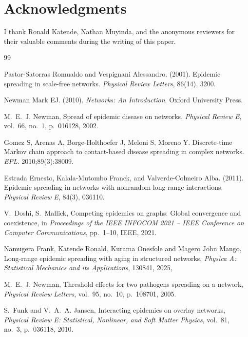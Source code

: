 \documentclass[a4paper,12pt]{scrartcl}
\theoremstyle{plain}%
\theoremstyle{definition}
\theoremstyle{remark}
\numberwithin{equation}{section}
\begin{document}
\section*{Acknowledgments}
I thank Ronald Katende, Nathan Muyinda, and the anonymous reviewers for their valuable comments during the writing of this paper.

{
\begin{thebibliography}{99}

Pastor-Satorras Romualdo and Vespignani Alessandro. (2001).
\newblock Epidemic spreading in scale-free networks.
\newblock \emph{Physical Review Letters}, 86(14), 3200.

Newman Mark EJ. (2010).
\newblock \emph{Networks: An Introduction}.
\newblock Oxford University Press.

M.~E.~J. Newman, Spread of epidemic disease on networks, \textit{Physical Review E}, vol.~66, no.~1, p.~016128, 2002.


Gomez S, Arenas A, Borge-Holthoefer J, Meloni S, Moreno Y. 
\newblock Discrete-time Markov chain approach to contact-based disease spreading in complex networks. \emph{EPL}. 2010;89(3):38009.

Estrada Ernesto, Kalala-Mutombo Franck, and Valverde-Colmeiro Alba. (2011).
\newblock Epidemic spreading in networks with nonrandom long-range interactions.
\newblock \emph{Physical Review E}, 84(3), 036110.

V.~Doshi, S.~Mallick, {Competing epidemics on graphs: Global convergence and coexistence}, 
in \emph{Proceedings of the IEEE INFOCOM 2021 -- IEEE Conference on Computer Communications}, pp.~1--10, IEEE, 2021.


Namugera Frank,  Katende Ronald,  Kurama Onesfole and Magero John Mango,
  {Long-range epidemic spreading with aging in structured networks},
  \emph{Physica A: Statistical Mechanics and its Applications}, {130841}, {2025},

M.~E.~J. Newman,
Threshold effects for two pathogens spreading on a network,
\textit{Physical Review Letters}, vol.~95, no.~10, p.~108701, 2005.

S.~Funk and V.~A.~A. Jansen,
Interacting epidemics on overlay networks,
\textit{Physical Review E: Statistical, Nonlinear, and Soft Matter Physics}, vol.~81, no.~3, p.~036118, 2010.



\end{thebibliography}}
\end{document}
